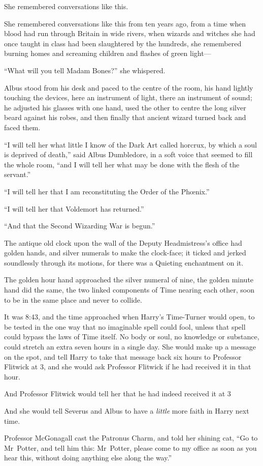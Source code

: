 She remembered conversations like this.

She remembered conversations like this from ten years ago, from a time when blood had run through Britain in wide rivers, when wizards and witches she had once taught in class had been slaughtered by the hundreds, she remembered burning homes and screaming children and flashes of green light—

“What will you tell Madam Bones?” she whispered.

Albus stood from his desk and paced to the centre of the room, his hand lightly touching the devices, here an instrument of light, there an instrument of sound; he adjusted his glasses with one hand, used the other to centre the long silver beard against his robes, and then finally that ancient wizard turned back and faced them.

“I will tell her what little I know of the Dark Art called horcrux, by which a soul is deprived of death,” said Albus Dumbledore, in a soft voice that seemed to fill the whole room, “and I will tell her what may be done with the flesh of the servant.”

“I will tell her that I am reconstituting the Order of the Phœnix.”

“I will tell her that Voldemort has returned.”

“And that the Second Wizarding War is begun.”


The antique old clock upon the wall of the Deputy Headmistress’s office had golden hands, and silver numerals to make the clock-face; it ticked and jerked soundlessly through its motions, for there was a Quieting enchantment on it.

The golden hour hand approached the silver numeral of nine, the golden minute hand did the same, the two linked components of Time nearing each other, soon to be in the same place and never to collide.

It was 8:43\pm, and the time approached when Harry’s Time-Turner would open, to be tested in the one way that no imaginable spell could fool, unless that spell could bypass the laws of Time itself. No body or soul, no knowledge or substance, could stretch an extra seven hours in a single day. She would make up a message on the spot, and tell Harry to take that message back six hours to Professor Flitwick at 3\pm, and she would ask Professor Flitwick if he had received it in that hour.

And Professor Flitwick would tell her that he had indeed received it at 3\pm

And she would tell Severus and Albus to have a \emph{little} more faith in Harry next time.

Professor McGonagall cast the Patronus Charm, and told her shining cat,
“Go to Mr~Potter, and tell him this: Mr~Potter, please come to my office as soon as you hear this, without doing anything else along the way.”

